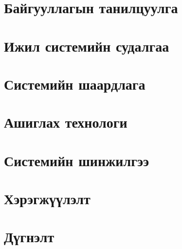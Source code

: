 
\chapter{Байгууллагын танилцуулга}


\chapter{Ижил системийн судалгаа}


\chapter{Системийн шаардлага}


\chapter{Ашиглах технологи}


\chapter{Системийн шинжилгээ}


\chapter{Хэрэгжүүлэлт}


\chapter{Дүгнэлт}
